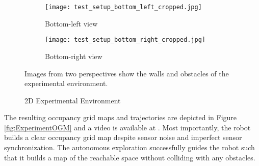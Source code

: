 \begin{figure}
	\centering
    	\begin{subfigure}[b]{0.45\textwidth}
        		\texttt{[image: test\_setup\_bottom\_left\_cropped.jpg]}
        		\caption{Bottom-left view}
        		\label{fig:Experiment_blv}
    	\end{subfigure}
	\hspace*{0.05\columnwidth}
	\begin{subfigure}[b]{0.45\textwidth}
        		\texttt{[image: test\_setup\_bottom\_right\_cropped.jpg]}
        		\caption{Bottom-right view}
        		\label{fig:Experiment_brv}
    	\end{subfigure}
\caption{2D Experimental Environment}
	\medskip
	\small
	Images from two perspectives show the walls and obstacles of the experimental environment.
\label{fig:ExpSetupPhoto}
\end{figure}


The resulting occupancy grid maps and trajectories are depicted in Figure \ref{fig:ExperimentOGM} and a video is available at \href{https://www.youtube.com/watch?v=CRQfhhICSj0&feature=youtu.be}{}. Most importantly, the robot builds a clear occupancy grid map despite sensor noise and imperfect sensor synchronization. The autonomous exploration successfully guides the robot such that it builds a map of the reachable space without colliding with any obstacles.


